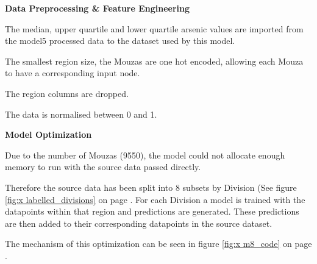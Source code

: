 \textbf{Data Preprocessing \& Feature Engineering}

The median, upper quartile and lower quartile arsenic values are imported from the model5 processed data to the dataset used by this model.

The smallest region size, the Mouzas are one hot encoded, allowing each Mouza to have a corresponding input node.

The region columns are dropped.

The data is normalised between 0 and 1.

\textbf{Model Optimization}

Due to the number of Mouzas (9550), the model could not allocate enough memory to run with the source data passed directly.

Therefore the source data has been split into 8 subsets by Division (See figure \ref{fig:x labelled_divisions} on page \pageref{fig:x labelled_divisions}. For each Division a model is trained with the datapoints within that region and predictions are generated. These predictions are then added to their corresponding datapoints in the source dataset.

The mechanism of this optimization can be seen in figure \ref{fig:x m8_code} on page \pageref{fig:x m8_code}.

